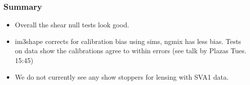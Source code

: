 \documentclass{beamer}
\begin{document}
\frame
{
    \frametitle{Summary}

    \begin{itemize}

        \item Overall the shear null tests look good.

        \item im3shape corrects for calibration bias using sims, ngmix has less
            bias.  Tests on data show the calibrations agree to within errors
            (see talk by Plazas Tues. 15:45)

        \item We do not currently see any show stoppers for lensing with SVA1 data.

    \end{itemize}
}
\end{document}
